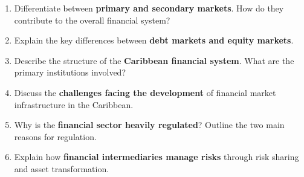 \begin{enumerate}
    \item Differentiate between \textbf{primary and secondary markets}. How do they contribute
    to the overall financial system?

    \item Explain the key differences between \textbf{debt markets and equity markets}.

    \item Describe the structure of the \textbf{Caribbean financial system}. What are the
    primary institutions involved?

    \item Discuss the \textbf{challenges facing the development} of financial market
    infrastructure in the Caribbean.

    \item Why is the \textbf{financial sector heavily regulated}? Outline the two main reasons for
    regulation.

    \item Explain how \textbf{financial intermediaries manage risks} through risk sharing and
    asset transformation.

\end{enumerate}
